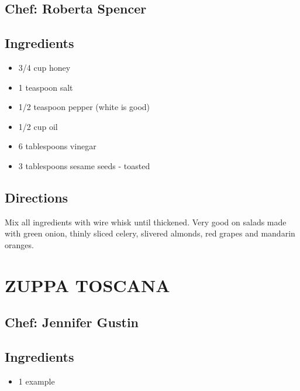 \documentclass[
]{book}
\providecommand{\tightlist}{%
  \setlength{\itemsep}{0pt}\setlength{\parskip}{0pt}}
\begin{document}
\hypertarget{chef-roberta-spencer-4}{%
\subsection*{Chef: Roberta Spencer}\label{chef-roberta-spencer-4}}


\hypertarget{ingredients-23}{%
\subsection*{Ingredients}\label{ingredients-23}}


\begin{itemize}
\tightlist
\item
  3/4 cup honey
\item
  1 teaspoon salt
\item
  1/2 teaspoon pepper (white is good)
\item
  1/2 cup oil
\item
  6 tablespoons vinegar
\item
  3 tablespoons sesame seeds - toasted
\end{itemize}

\hypertarget{directions-23}{%
\subsection*{Directions}\label{directions-23}}


Mix all ingredients with wire whisk until thickened. Very good on salads made with green onion,
thinly sliced celery, slivered almonds, red grapes and mandarin oranges.

\hypertarget{zuppa-toscana}{%
\section*{ZUPPA TOSCANA}\label{zuppa-toscana}}


\hypertarget{chef-jennifer-gustin-6}{%
\subsection*{Chef: Jennifer Gustin}\label{chef-jennifer-gustin-6}}


\hypertarget{ingredients-24}{%
\subsection*{Ingredients}\label{ingredients-24}}


\begin{itemize}
\tightlist
\item
  1 example
\end{itemize}
\end{document}
